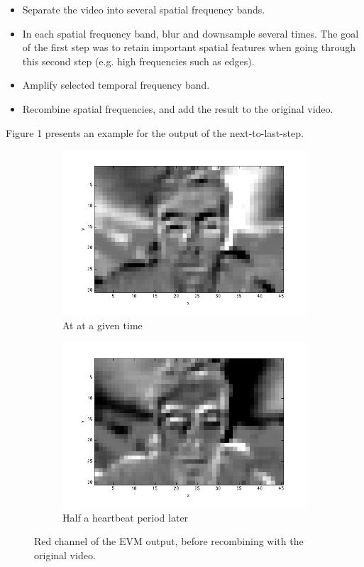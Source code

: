 \documentclass[12pt]{article}
\begin{document}
  \begin{itemize}
    \item Separate the video into several spatial frequency bands.
    \item In each spatial frequency band, blur and downsample several times. The goal of the first step was to retain important spatial features when going through this second step (e.g. high frequencies such as edges).
    \item Amplify selected temporal frequency band.
    \item Recombine spatial frequencies, and add the result to the original video.
  \end{itemize}
  Figure 1 presents an example for the output of the next-to-last-step. 

  \begin{figure}
    \begin{subfigure}{.5\textwidth}
      \captionsetup{justification=centering}
      \includegraphics[width=\textwidth]{images/red_peak.png}
      \caption{At at a given time}
    \end{subfigure}
    \begin{subfigure}{.5\textwidth}
      \captionsetup{justification=centering}
      \includegraphics[width=\textwidth]{images/red_trough.png}
      \caption{Half a heartbeat period later}
    \end{subfigure}
    \captionsetup{justification=centering}
    \caption{Red channel of the EVM output, before recombining with the original video.}
  \end{figure}
\end{document}
